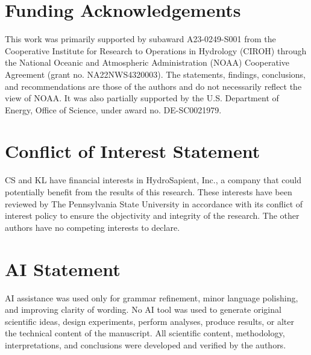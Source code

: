 \section*{Funding Acknowledgements}
This work was primarily supported by subaward A23-0249-S001 from the Cooperative Institute for Research to Operations in Hydrology (CIROH) through the National Oceanic and Atmospheric Administration (NOAA) Cooperative Agreement (grant no. NA22NWS4320003). The statements, findings, conclusions, and recommendations are those of the authors and do not necessarily reflect the view of NOAA. It was also partially supported by the U.S. Department of Energy, Office of Science, under award no. DE-SC0021979. 


\section*{Conflict of Interest Statement}
CS and KL have financial interests in HydroSapient, Inc., a company that could potentially benefit from the results of this research. These interests have been reviewed by The Pennsylvania State University in accordance with its conflict of interest policy to ensure the objectivity and integrity of the research. The other authors have no competing interests to declare.


\section*{AI Statement}
AI assistance was used only for grammar refinement, minor language polishing, and improving clarity of wording. No AI tool was used to generate original scientific ideas, design experiments, perform analyses, produce results, or alter the technical content of the manuscript. All scientific content, methodology, interpretations, and conclusions were developed and verified by the authors.



